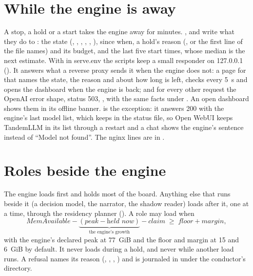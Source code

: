 \section{While the engine is away}\label{sec:status-page}

A stop, a hold or a start takes the engine away for minutes. ,  and  write what they do to : the state (, , , , , ), since when, a hold's reason (, or the first line of the file  names) and its budget, and the last five start times, whose median is the next estimate. With  in serve.env the scripts keep a small responder on 127.0.0.1 (). It answers what a reverse proxy sends it when the engine does not: a page for  that names the state, the reason and about how long is left, checks  every 5~s and opens the dashboard when the engine is back; and for every other request the OpenAI error shape, status 503, , with the same facts under . An open dashboard shows them in its offline banner.  is the exception: it answers 200 with the engine's last model list, which  keeps in the status file, so Open WebUI keeps TandemLLM in its list through a restart and a chat shows the engine's sentence instead of ``Model not found''. The nginx lines are in .

\section{Roles beside the engine}\label{sec:residency}

The engine loads first and holds most of the board. Anything else that runs beside it (a decision model, the narrator, the shadow reader) loads after it, one at a time, through the residency planner (). A role may load when
\[
\textit{MemAvailable} - \underbrace{(\textit{peak} - \textit{held now})}_{\text{the engine's growth}} - \textit{claim} \;\ge\; \textit{floor} + \textit{margin},
\]
with the engine's declared peak at 77~GiB and the floor and margin at 15 and 6~GiB by default. It never loads during a hold, and never while another load runs. A refusal names its reason (, , , ) and is journaled in  under the conductor's directory.

